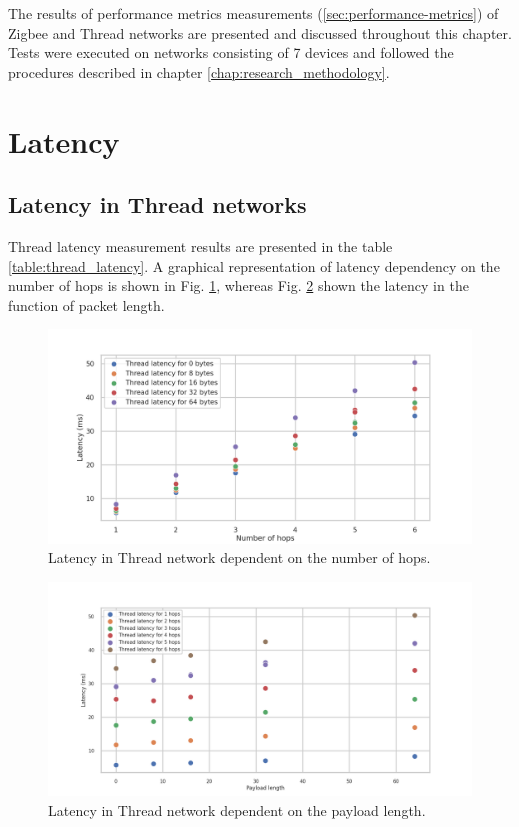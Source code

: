 
The results of performance metrics  
measurements (\ref{sec:performance-metrics}) of Zigbee and Thread
networks are presented and discussed throughout this chapter. Tests
were executed on networks consisting of 7 devices
and followed the procedures described in chapter \ref{chap:research_methodology}.

\section{Latency}

\subsection{Latency in Thread networks}

Thread latency measurement results are presented in the table 
\ref{table:thread_latency}. A graphical representation of latency dependency on the
number of hops is shown in Fig. \ref{fig:thread_latency_all}, whereas Fig. \ref{fig:thread_latency_length} shown the latency in
the function of packet length.

\begin{figure}[H]
    \centering
    \includegraphics[scale=0.45]{images/Thread_Latency_all.png}
    \caption{Latency in Thread network dependent on the number of hops.}
    \label{fig:thread_latency_all}
\end{figure}

\begin{figure}[H]
    \centering
    \includegraphics[scale=0.45]{images/Thread_Latency_vs_length.png}
    \caption{Latency in Thread network dependent on the payload length. }
    \label{fig:thread_latency_length}
\end{figure}


